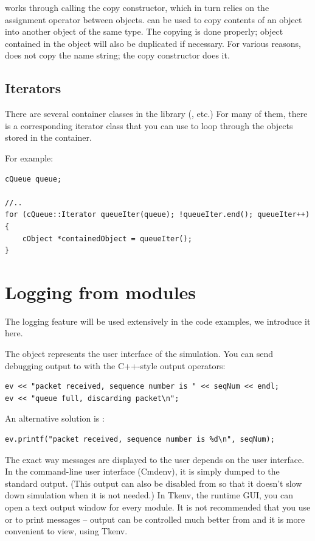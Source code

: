  works through calling the copy constructor, which in
turn relies on the assignment operator between objects.
 can be used to copy contents of an object into
another object of the same type. The copying is done properly; object
contained in the object will also be duplicated if necessary. For
various reasons,  does not copy the name string;
the copy constructor does it.


\subsection{Iterators}


There are several container classes in the library (,
 etc.) For many of them, there is a corresponding
iterator class that you can use to loop through the objects stored in
the container.

For example:

\begin{verbatim}
cQueue queue;

//..
for (cQueue::Iterator queueIter(queue); !queueIter.end(); queueIter++)
{
    cObject *containedObject = queueIter();
}
\end{verbatim}


\section{Logging from modules}

The logging feature will be used extensively in the code examples,
we introduce it here.

The  object represents the user interface of the
simulation.  You can send debugging output to  with the C++-style
output operators:

\begin{verbatim}
ev << "packet received, sequence number is " << seqNum << endl;
ev << "queue full, discarding packet\n";
\end{verbatim}

An alternative solution is :

\begin{verbatim}
ev.printf("packet received, sequence number is %d\n", seqNum);
\end{verbatim}

The exact way messages are displayed to the user depends on the user
interface. In the command-line user interface (Cmdenv),
it is simply dumped to the standard output. (This output can also be
disabled from  so that it doesn't slow down simulation
when it is not needed.) In Tkenv, the runtime GUI, you can open
a text output window for every module.
It is not recommended that you use  or 
to print messages --  output can be controlled much better
from  and it is more convenient to view, using Tkenv.

